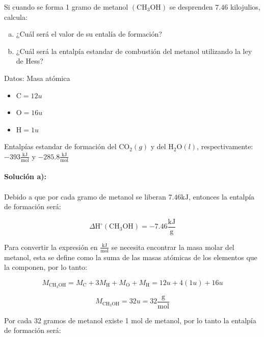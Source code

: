 \documentclass[12pt]{article}
\begin{document}
Si cuando se forma 1 gramo de metanol $(\mathrm{CH}_3\mathrm{OH})$ se desprenden $7.46$ kilojulios, calcula:

\begin{enumerate}[a)]
	\item ¿Cuál será el valor de su entalía de formación?
	
	\item ¿Cuál será la entalpía estandar de combustión del metanol utilizando la ley de Hess?
\end{enumerate}

Datos: Masa atómica

\begin{itemize}
	\item $\mathrm{C}=12u$
	
	\item $\mathrm{O}=16u$
	
	\item $\mathrm{H}=1u$
\end{itemize}

Entalpías estandar de formación del $\mathrm{CO}_2(g)$ y del $\mathrm{H}_2\mathrm{O}(l)$, respectivamente: $-393\frac{\mathrm{kJ}}{\mathrm{mol}}$ y $-285.8\frac{\mathrm{kJ}}{\mathrm{mol}}$\\
\\
\textbf{Solución a):}\\
\\
Debido a que por cada gramo de metanol se liberan 7.46$\mathrm{kJ}$, entonces la entalpía de formación será:

\begin{displaymath}
	\Delta\mathrm{H}^{\circ}(\mathrm{CH}_3\mathrm{OH})=-7.46\frac{\mathrm{kJ}}{\mathrm{g}}
\end{displaymath}

Para convertir la expresión en $\frac{\mathrm{kJ}}{\mathrm{mol}}$ se necesita encontrar la masa molar del metanol, esta se define como la suma de las masas atómicas de los elementos que la componen, por lo tanto:

\begin{displaymath}
	M_{\mathrm{CH}_3\mathrm{OH}}=M_{\mathrm{C}}+3M_{\mathrm{H}}+M_{\mathrm{O}}+M_{\mathrm{H}}=12u+4(1u)+16u
\end{displaymath}

\begin{displaymath}
	M_{\mathrm{CH}_3\mathrm{OH}}=32u=32\frac{\mathrm{g}}{\mathrm{mol}}
\end{displaymath}

Por cada 32 gramos de metanol existe 1 mol de metanol, por lo tanto la entalpía de formación será:
\end{document}
